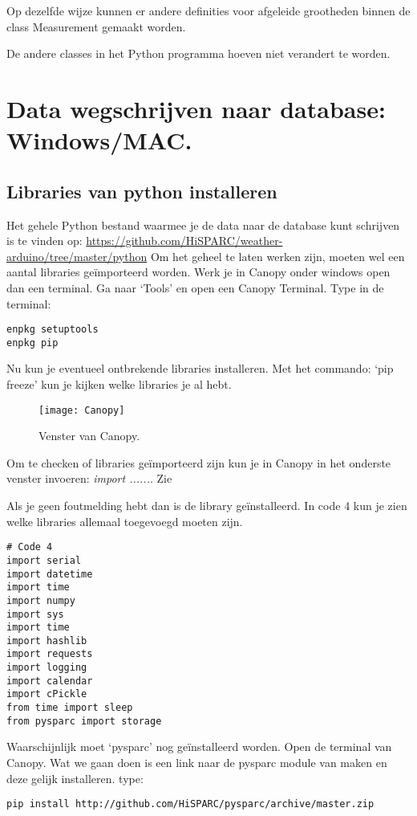 Op dezelfde wijze kunnen er andere definities voor afgeleide grootheden
binnen de class Measurement gemaakt worden. 

De andere classes in het Python programma hoeven niet verandert te worden.


\section{Data wegschrijven naar \hisparc database: Windows/MAC.}


\subsection{Libraries van python installeren}

Het gehele Python bestand waarmee je de data naar de \hisparc database kunt schrijven 
is te vinden op:
\url{https://github.com/HiSPARC/weather-arduino/tree/master/python}
Om het geheel te laten werken zijn, moeten wel een aantal libraries geïmporteerd worden.
Werk je in Canopy onder windows open dan een terminal. Ga naar `Tools' en open 
een Canopy Terminal.
Type in de terminal:
\begin{verbatim}
enpkg setuptools
enpkg pip
\end{verbatim}

Nu kun je eventueel ontbrekende libraries installeren. Met het commando: 
`pip freeze' kun je kijken welke libraries je al hebt. 

\begin{figure}
    \centering
    \texttt{[image: Canopy]}
    \caption{Venster van Canopy.}
   \label{Canopy}
\end{figure}

Om te checken of libraries geïmporteerd zijn kun je in Canopy in het onderste venster
invoeren: \emph{import ......}. Zie 

Als je geen foutmelding hebt dan is de library geïnstalleerd. 
In code 4 kun je zien welke libraries allemaal toegevoegd moeten zijn.
 
\begin{verbatim}
# Code 4
import serial
import datetime
import time
import numpy
import sys
import time
import hashlib
import requests
import logging
import calendar
import cPickle 
from time import sleep
from pysparc import storage

\end{verbatim}

Waarschijnlijk moet `pysparc' nog geïnstalleerd worden. Open de terminal van
Canopy. Wat we gaan doen is een link naar de pysparc module van \hisparc
maken en deze gelijk installeren. type: 
\begin{verbatim} 
pip install http://github.com/HiSPARC/pysparc/archive/master.zip 
\end{verbatim}

